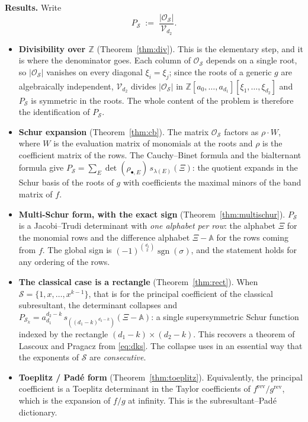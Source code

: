 \documentclass[11pt,reqno]{amsart}
\theoremstyle{plain}
\theoremstyle{definition}
\DeclareMathOperator{\sgn}{sgn}
\newcommand{\bA}{\mathbb{A}}
\newcommand{\bX}{\Xi}
\newcommand{\cO}{\mathcal{O}}
\newcommand{\cS}{\mathcal{S}}
\newcommand{\cV}{\mathcal{V}}
\newcommand{\ZZ}{\mathbb{Z}}
\newcommand{\rev}{\mathrm{rev}}
\begin{document}
\medskip
\noindent\textbf{Results.} Write
\[
  P_\cS \;:=\; \frac{|\cO_\cS|}{\cV_{d_2}} .
\]
\begin{itemize}
\item \textbf{Divisibility over $\ZZ$} (Theorem~\ref{thm:div}). This is the
elementary step, and it is where the denominator goes. Each column of $\cO_\cS$
depends on a single root, so $|\cO_\cS|$ vanishes on every diagonal
$\xi_i=\xi_j$; since the roots of a generic $g$ are algebraically independent,
$\cV_{d_2}$ divides $|\cO_\cS|$ in $\ZZ[a_0,\dots,a_{d_1}][\xi_1,\dots,\xi_{d_2}]$
and $P_\cS$ is symmetric in the roots. The whole content of the problem is
therefore the identification of $P_\cS$.

\item \textbf{Schur expansion} (Theorem~\ref{thm:cb}). The matrix $\cO_\cS$
factors as $\rho\cdot W$, where $W$ is the evaluation matrix of monomials at the
roots and $\rho$ is the coefficient matrix of the rows. The Cauchy--Binet formula
and the bialternant formula give
$P_\cS=\sum_E \det(\rho_{\bullet,E})\,s_{\lambda(E)}(\bX)$: the quotient expands
in the Schur basis of the roots of $g$ with coefficients the maximal minors of the
band matrix of $f$.

\item \textbf{Multi-Schur form, with the exact sign} (Theorem~\ref{thm:multischur}).
$P_\cS$ is a Jacobi--Trudi determinant with \emph{one alphabet per row}: the
alphabet $\bX$ for the monomial rows and the difference alphabet $\bX-\bA$ for
the rows coming from $f$. The global sign is $(-1)^{\binom{d_2}{2}}\sgn(\sigma)$,
and the statement holds for any ordering of the rows.

\item \textbf{The classical case is a rectangle} (Theorem~\ref{thm:rect}). When
$\cS=\{1,x,\dots,x^{k-1}\}$, that is for the principal coefficient of the
classical subresultant, the determinant collapses and
$P_{\cS_k}=a_{d_1}^{d_2-k}\,s_{((d_1-k)^{d_2-k})}(\bX-\bA)$: a single
supersymmetric Schur function indexed by the rectangle
$(d_1-k)\times(d_2-k)$. This recovers a theorem of Lascoux and Pragacz
\cite{LP} from \eqref{eq:dks}. The collapse uses in an essential way that the
exponents of $\cS$ are \emph{consecutive}.

\item \textbf{Toeplitz / Pad\'e form} (Theorem~\ref{thm:toeplitz}). Equivalently,
the principal coefficient is a Toeplitz determinant in the Taylor coefficients of
$f^\rev/g^\rev$, which is the expansion of $f/g$ at infinity. This is the
subresultant--Pad\'e dictionary.


\end{itemize}
\end{document}
